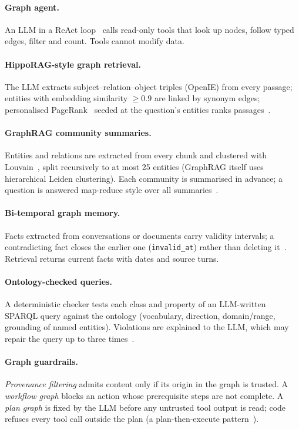\documentclass[11pt,a4paper]{article}
\begin{document}
\paragraph{Graph agent.} An LLM in a ReAct loop~\cite{yao2023react} calls read-only tools that look up nodes,
follow typed edges, filter and count. Tools cannot modify data.

\paragraph{HippoRAG-style graph retrieval.} The LLM extracts subject--relation--object triples (OpenIE) from
every passage; entities with embedding similarity $\geq 0.9$ are linked by synonym edges; personalised
PageRank~\cite{haveliwala2002ppr} seeded at the question's entities ranks passages~\cite{gutierrez2025hipporag2}.

\paragraph{GraphRAG community summaries.} Entities and relations are extracted from every chunk and clustered with
Louvain~\cite{blondel2008louvain}, split recursively to at most 25 entities (GraphRAG itself uses hierarchical
Leiden clustering). Each community is summarised in
advance; a question is answered map-reduce style over all summaries~\cite{edge2024graphrag}.

\paragraph{Bi-temporal graph memory.} Facts extracted from conversations or documents carry validity intervals;
a contradicting fact closes the earlier one (\texttt{invalid\_at}) rather than deleting it~\cite{rasmussen2025zep}.
Retrieval returns current facts with dates and source turns.

\paragraph{Ontology-checked queries.} A deterministic checker tests each class and property of an LLM-written
SPARQL query against the ontology (vocabulary, direction, domain/range, grounding of named entities). Violations
are explained to the LLM, which may repair the query up to three times~\cite{allemang2024ontologies}.

\paragraph{Graph guardrails.} \emph{Provenance filtering} admits content only if its origin in the graph is
trusted. A \emph{workflow graph} blocks an action whose prerequisite steps are not complete. A \emph{plan graph}
is fixed by the LLM before any untrusted tool output is read; code refuses every tool call outside the plan
(a plan-then-execute pattern~\cite{beurerkellner2025patterns,debenedetti2025camel}).
\end{document}
